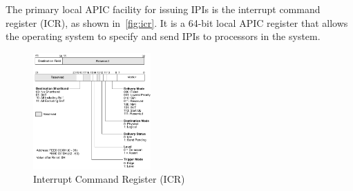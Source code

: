 The primary local APIC facility for issuing IPIs is the interrupt command register (ICR), as shown in~\autoref{fig:icr}. It is a 64-bit local APIC register that allows the operating system to specify and send IPIs to processors in the system.


\begin{figure}[th]
  \includegraphics[width=0.40\textwidth]{figures/icr}
  \centering
  \caption{Interrupt Command Register (ICR)}
  \label{fig:icr}
\end{figure}

